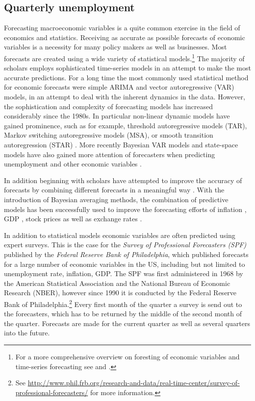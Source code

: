 \documentclass[12pt,fullpage,endnotes]{article}
\begin{document}
\subsection{Quarterly unemployment}\label{econ}
Forecasting macroeconomic variables is a quite common exercise in the field of economics and statistics. Receiving as accurate as possible forecasts of economic variables is a necessity for many policy makers as well as businesses. Most forecasts are created using a wide variety of statistical models.\footnote{For a more comprehensive overview on foresting of economic variables and time-series forecasting see \citet{Elliott:Timmermann:2008} and \citet{Goijer:Hyndman:2006}.} 
The majority of scholars employs sophisticated time-series models in an attempt to make the most accurate predictions. For a long time the most commonly used statistical method for economic forecasts were simple ARIMA and vector autoregressive (VAR) models, in an attempt to deal with the inherent dynamics in the data. However, the sophistication and complexity of forecasting models has increased considerably since the 1980s. In particular non-linear dynamic models have gained prominence, such as for example, threshold autoregressive models (TAR), Markov switching autoregressive models (MSA), or smooth transition autoregression (STAR) \citep{Elliott:Timmermann:2008,Montgomery:etal:1998}. More recently Bayesian VAR models and state-space models have  also gained more attention of forecasters when predicting unemployment and other economic variables \citep{Goijer:Hyndman:2006,Elliott:Timmermann:2008}. 

In addition beginning with \citet{Bates:1969} scholars have attempted to improve the accuracy of forecasts by combining different forecasts in a meaningful way \citep{Palm:Zellner:1992,Elliott:Timmermann:2008}.  With the introduction of Bayesian averaging methods, the combination of predictive models has been successfully used to improve the forecasting efforts of inflation \citep{Koop:2010,Wright:2009}, GDP \citep{Billio:2010}, stock prices \citep{Billio:2011} as well as exchange rates \citep{Wright:2008}.  

In addition to statistical models economic variables are often predicted using expert surveys. This is the case for the \textit{Survey of Professional Forecasters (SPF)} published by the \textit{Federal Reserve Bank of Philadelphia}, which published forecasts for a large number of economic variables in the US, including but not limited to unemployment rate, inflation, GDP. The SPF was first administered in 1968 by the American Statistical Association and the National Bureau of Economic Research (NBER), however since 1990 it is conducted by the Federal Reserve Bank of Philadelphia.\footnote{See \url{http://www.phil.frb.org/research-and-data/real-time-center/survey-of-professional-forecasters/} for more information.} Every first month of the quarter a survey is send out to the forecasters, which has to be returned by the middle of the second month of the quarter. Forecasts are made for the current quarter as well as several quarters into the future. 
\end{document}
